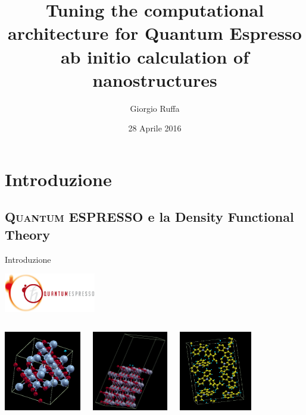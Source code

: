 \documentclass[8pt]{beamer}
\title[Tuning the computational architecture for Quantum Espresso ab initio calculation of nanostructures] %
{Tuning the computational architecture for Quantum Espresso ab initio calculation of nanostructures}
\author[Giorgio Ruffa] 
{Giorgio Ruffa}
\institute[Università degli Studi di Milano]{Università degli Studi di Milano}
\date{28 Aprile 2016}
\newcommand\QE{\textsc{Quantum} ESPRESSO }
\begin{document}
\begin{frame}
  \titlepage
\end{frame}

\section{Introduzione}
\subsection{\QE e la Density Functional Theory}

\begin{frame}{Introduzione}
\begin{center}
		\includegraphics[width=4cm]{beam_qe_logo.jpg}
\end{center}
\begin{columns}
		\begin{center}
			\includegraphics[height=3.5cm]{beam_co3.png}
		\end{center}
		\begin{center}
			\includegraphics[height=3.5cm]{titania_crystal.png}
		\end{center}
		\begin{center}
			\includegraphics[height=3.5cm]{beam_cbp.png}
		\end{center}
\end{columns}
		
\end{frame}
\end{document}
